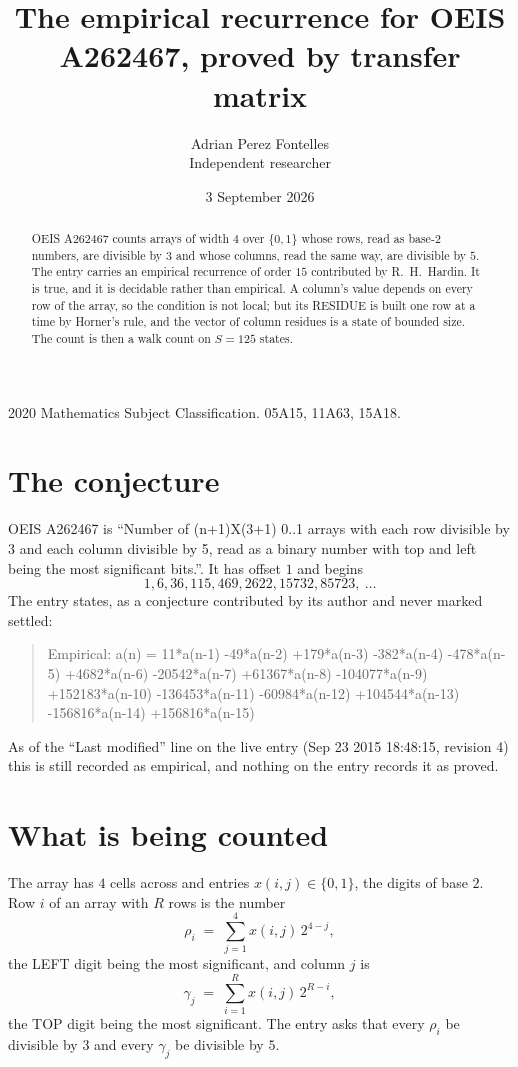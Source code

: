 \documentclass[11pt,a4paper]{article}
\title{The empirical recurrence for OEIS A262467, proved by transfer matrix}
\author{Adrian Perez Fontelles\\ \small Independent researcher}
\date{3 September 2026}
\theoremstyle{plain}
\theoremstyle{definition}
\begin{document}
\maketitle

\begin{abstract}
OEIS A262467 counts arrays of width $4$ over $\{0,1\}$ whose rows, read as base-$2$
numbers, are divisible by $3$ and whose columns, read the same way, are divisible by
$5$. The entry carries an empirical recurrence of order $15$ contributed by
R.~H.~Hardin. It is true, and it is decidable rather than empirical. A column's value depends on
every row of the array, so the condition is not local; but its RESIDUE is built one row at a
time by Horner's rule, and the vector of column residues is a state of bounded size. The count
is then a walk count on $S=125$ states.
\end{abstract}

\noindent\small 2020 Mathematics Subject Classification. 05A15, 11A63, 15A18.\normalsize

\section{The conjecture}

OEIS A262467 is ``Number of (n+1)X(3+1) 0..1 arrays with each row divisible by 3 and each column divisible by 5, read as a binary number with top and left being the most significant bits.''. It has offset $1$ and begins
\[
1, 6, 36, 115, 469, 2622, 15732, 85723,\ \dots
\]
The entry states, as a conjecture contributed by its author and never marked settled:
\begin{quote}
Empirical: a(n) = 11*a(n-1) -49*a(n-2) +179*a(n-3) -382*a(n-4) -478*a(n-5) +4682*a(n-6) -20542*a(n-7) +61367*a(n-8) -104077*a(n-9) +152183*a(n-10) -136453*a(n-11) -60984*a(n-12) +104544*a(n-13) -156816*a(n-14) +156816*a(n-15)
\end{quote}
As of the ``Last modified'' line on the live entry (Sep 23 2015 18:48:15, revision 4) this is still
recorded as empirical, and nothing on the entry records it as proved.

\section{What is being counted}

The array has $4$ cells across and entries $x(i,j)\in\{0,1\}$, the digits of
base $2$. Row $i$ of an array with $R$ rows is the number
\[
\rho_i\;=\;\sum_{j=1}^{4}x(i,j)\,2^{4-j} ,
\]
the LEFT digit being the most significant, and column $j$ is
\[
\gamma_j\;=\;\sum_{i=1}^{R}x(i,j)\,2^{R-i} ,
\]
the TOP digit being the most significant. The entry asks that every $\rho_i$ be divisible by
$3$ and every $\gamma_j$ be divisible by $5$.
\end{document}
